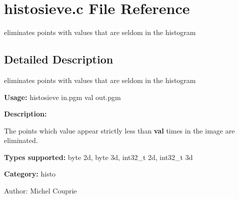 \section{histosieve.c File Reference}
\label{histosieve_8c}
eliminates points with values that are seldom in the histogram 



\subsection{Detailed Description}
eliminates points with values that are seldom in the histogram 

{\bf Usage:} histosieve in.pgm val out.pgm

{\bf Description:}

The points which value appear strictly less than {\bf val} times in the image are eliminated.

{\bf Types supported:} byte 2d, byte 3d, int32\_\-t 2d, int32\_\-t 3d

{\bf Category:} histo

\begin{Desc}
\item[Author:]Michel Couprie \end{Desc}
